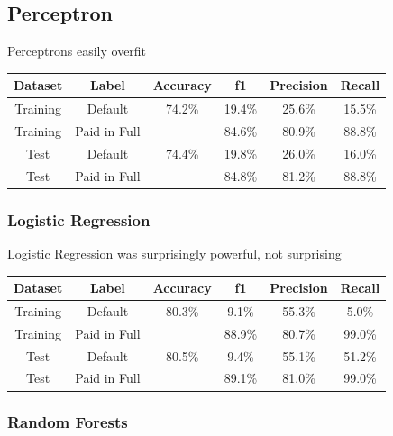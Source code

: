 \subsection{Perceptron}
Perceptrons easily overfit

        \begin{center}
        \begin{tabular}{| c | c || c | c | c | c |}
        \hline
        Dataset & Label & Accuracy & f1 & Precision & Recall \\
        \hline \hline
         Training & Default         & 74.2\% & 19.4\% & 25.6\% & 15.5\% \\
         Training & Paid in Full    &       & 84.6\% & 80.9\% & 88.8\% \\
         \hline
         Test & Default             & 74.4\% & 19.8\% & 26.0\% & 16.0\% \\
         Test & Paid in Full        &       & 84.8\% & 81.2\% & 88.8\% \\
         \hline
        \end{tabular}
        \end{center}


\subsubsection{Logistic Regression}
Logistic Regression was surprisingly powerful, not surprising

        \begin{center}
        \begin{tabular}{| c | c || c | c | c | c |}
        \hline
        Dataset & Label & Accuracy & f1 & Precision & Recall \\
        \hline \hline
         Training & Default         & 80.3\% & 9.1\% & 55.3\% & 5.0\% \\
         Training & Paid in Full    &       & 88.9\% & 80.7\% & 99.0\% \\
         \hline
         Test & Default             & 80.5\% & 9.4\% & 55.1\% & 51.2\% \\
         Test & Paid in Full        &       & 89.1\% & 81.0\% & 99.0\% \\
         \hline
        \end{tabular}
        \end{center}


\subsubsection{Random Forests}

